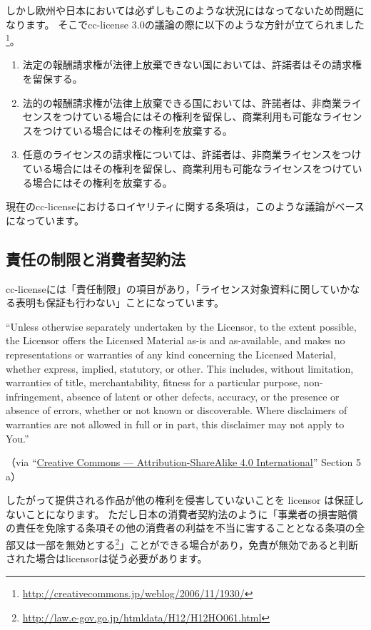 \documentclass{ltjsarticle}
\begin{document}
しかし欧州や日本においては必ずしもこのような状況にはなってないため問題になります。
そこでcc-license 3.0の議論の際に以下のような方針が立てられました\footnote{\url{http://creativecommons.jp/weblog/2006/11/1930/}}。
\begin{enumerate}
\item 法定の報酬請求権が法律上放棄できない国においては、許諾者はその請求権を留保する。
\item 法的の報酬請求権が法律上放棄できる国においては、許諾者は、非商業ライセンスをつけている場合にはその権利を留保し、商業利用も可能なライセンスをつけている場合にはその権利を放棄する。
\item 任意のライセンスの請求権については、許諾者は、非商業ライセンスをつけている場合にはその権利を留保し、商業利用も可能なライセンスをつけている場合にはその権利を放棄する。
\end{enumerate}
現在のcc-licenseにおけるロイヤリティに関する条項は，このような議論がベースになっています。


\subsection{責任の制限と消費者契約法}

cc-licenseには「責任制限」の項目があり，「ライセンス対象資料に関していかなる表明も保証も行わない」ことになっています。
\begin{mdframed}
``Unless otherwise separately undertaken by the Licensor, to the extent possible, the Licensor offers the Licensed Material as-is and as-available, and makes no representations or warranties of any kind concerning the Licensed Material, whether express, implied, statutory, or other. This includes, without limitation, warranties of title, merchantability, fitness for a particular purpose, non-infringement, absence of latent or other defects, accuracy, or the presence or absence of errors, whether or not known or discoverable. Where disclaimers of warranties are not allowed in full or in part, this disclaimer may not apply to You.'' \par
（via ``\href{http://creativecommons.org/licenses/by-sa/4.0/legalcode}{Creative Commons — Attribution-ShareAlike 4.0 International}'' Section 5 a）
\end{mdframed}
したがって提供される作品が他の権利を侵害していないことを licensor は保証しないことになります。
ただし日本の消費者契約法のように「事業者の損害賠償の責任を免除する条項その他の消費者の利益を不当に害することとなる条項の全部又は一部を無効とする\footnote{\url{http://law.e-gov.go.jp/htmldata/H12/H12HO061.html}}」ことができる場合があり，免責が無効であると判断された場合はlicensorは従う必要があります。
\end{document}
